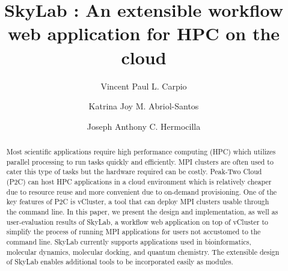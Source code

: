 \documentclass[sigconf]{acmart}
\begin{document}
\title{SkyLab : An extensible workflow web application for HPC on the cloud}

\author{Vincent Paul L. Carpio}

\author{Katrina Joy M. Abriol-Santos}

\author{Joseph Anthony C. Hermocilla}



\renewcommand{\shortauthors}{V. P. Carpio et. al.}


\begin{abstract}
Most scientific applications require high performance computing (HPC) which utilizes parallel processing to run tasks quickly and efficiently. MPI clusters are often used to cater this type of tasks but the hardware required can be costly. Peak-Two Cloud (P2C) can host HPC applications in a cloud environment which is relatively cheaper due to resource reuse and more convenient due to on-demand provisioning. One of the key features of P2C is vCluster, a tool that can deploy MPI clusters usable through the command line. In this paper, we present the design and implementation, as well as user-evaluation results of SkyLab, a workflow web application on top of vCluster to simplify the process of running MPI applications for users not accustomed to the command line. SkyLab currently supports applications used in bioinformatics, molecular dynamics, molecular docking, and quantum chemistry. The extensible design of SkyLab enables additional tools to be incorporated easily as modules. 
\end{abstract}
\end{document}
